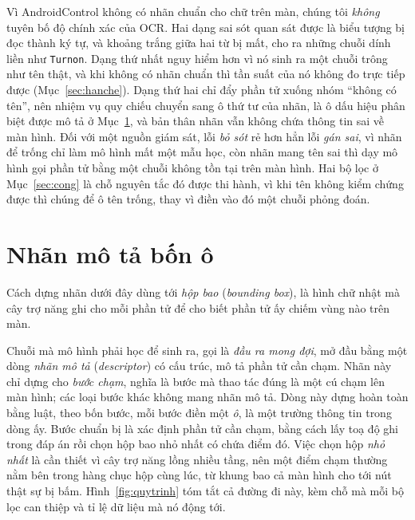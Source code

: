 \documentclass[12pt,a4paper,onecolumn]{article}
\newcommand{\ôvuông}[2]{\tikz[baseline=-0.45ex]{\draw[#1,line width=0.9pt,#2] (0,0) rectangle (0.34,0.18);}}
\newcommand{\code}[1]{{\small\texttt{#1}}}
\begin{document}
Vì AndroidControl không có nhãn chuẩn cho chữ trên màn, chúng tôi \emph{không} tuyên bố độ
chính xác của OCR. Hai dạng sai sót quan sát được là biểu tượng bị đọc thành ký tự, và
khoảng trắng giữa hai từ bị mất, cho ra những chuỗi dính liền như \code{Turnon}. Dạng thứ
nhất nguy hiểm hơn vì nó sinh ra một chuỗi trông như tên thật, và khi không có nhãn chuẩn
thì tần suất của nó không đo trực tiếp được (Mục~\ref{sec:hanche}). Dạng thứ hai chỉ đẩy
phần tử xuống nhóm ``không có tên'', nên nhiệm vụ quy chiếu chuyển sang ô thứ tư của nhãn, là ô dấu hiệu phân biệt được mô tả
ở Mục~\ref{sec:nhan}, và bản thân nhãn vẫn không chứa thông tin sai về màn hình. Đối với một nguồn giám sát,
lỗi \emph{bỏ sót} rẻ hơn hẳn lỗi \emph{gán sai}, vì nhãn để trống chỉ làm mô hình mất một
mẫu học, còn nhãn mang tên sai thì dạy mô hình gọi phần tử bằng một chuỗi không tồn tại
trên màn hình. Hai bộ lọc ở Mục~\ref{sec:cong} là chỗ nguyên tắc đó được thi hành, vì khi tên không kiểm
chứng được thì chúng để ô tên trống, thay vì điền vào đó một chuỗi phỏng đoán.

\section{Nhãn mô tả bốn ô}
\label{sec:nhan}

Cách dựng nhãn dưới đây dùng tới \emph{hộp bao} (\emph{bounding box}), là hình chữ nhật mà
cây trợ năng ghi cho mỗi phần tử để cho biết phần tử ấy chiếm vùng nào trên màn.

Chuỗi mà mô hình phải học để sinh ra, gọi là \emph{đầu ra mong đợi}, mở đầu bằng một dòng \emph{nhãn mô tả} (\emph{descriptor}) có cấu trúc, mô tả phần tử cần
chạm. Nhãn này chỉ
dựng cho \emph{bước chạm}, nghĩa là bước mà thao tác đúng là một cú chạm lên màn hình; các loại
bước khác không mang nhãn mô tả. Dòng này dựng hoàn toàn bằng luật, theo bốn bước, mỗi bước điền một \emph{ô}, là một trường thông tin trong dòng ấy. Bước chuẩn bị là xác định phần tử cần chạm, bằng cách lấy toạ độ ghi trong đáp án rồi chọn
hộp bao nhỏ nhất có chứa điểm đó. Việc chọn hộp \emph{nhỏ nhất} là cần thiết vì cây trợ năng lồng nhiều tầng, nên một điểm chạm
thường nằm bên trong hàng chục hộp cùng lúc, từ khung bao cả màn hình cho tới nút thật sự
bị bấm. Hình~\ref{fig:quytrinh} tóm tắt cả đường đi này, kèm chỗ mà mỗi bộ lọc can thiệp và
tỉ lệ dữ liệu mà nó động tới.
\end{document}
